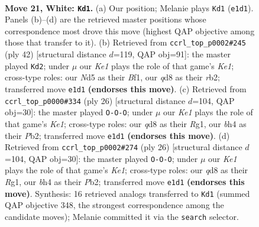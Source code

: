 \documentclass[11pt]{article}
\begin{document}
\clearpage

\begin{figure}[p]\centering
\begin{subfigure}{0.46\textwidth}\centering
\resizebox{\linewidth}{!}{%
\newchessgame
\chessboard[
  setfen={rn1qk1r1/3b1p2/1p1p4/pBpN4/P3P2b/5N1P/RP1Q2P1/4K2R w Kq - 0 21},
  showmover=false,
  pgfstyle=straightmove, color=movearrow, markmove={e1-d1}
]}
\caption{}
\end{subfigure}\hfill
\begin{subfigure}{0.46\textwidth}\centering
\resizebox{\linewidth}{!}{%
\newchessgame
\chessboard[
  setfen={2q1k2r/5ppp/p2p4/3Np3/R2PP1bb/5P2/1rN3PP/3QKB1R w k - 3 22},
  showmover=false,
  pgfstyle=straightmove, color=movearrow, markmove={e1-d2}
]}
\caption{}
\end{subfigure}
\\[4pt]
\begin{subfigure}{0.46\textwidth}\centering
\resizebox{\linewidth}{!}{%
\newchessgame
\chessboard[
  setfen={1rbqk2r/p3bpp1/2pp4/4p1Bn/2B1P2P/2N5/PPPQ1P2/R3K1R1 w Qk - 2 14},
  showmover=false,
  pgfstyle=straightmove, color=movearrow, markmove={e1-c1}
]}
\caption{}
\end{subfigure}\hfill
\begin{subfigure}{0.46\textwidth}\centering
\resizebox{\linewidth}{!}{%
\newchessgame
\chessboard[
  setfen={1rbqk2r/p3bpp1/2pp4/4p1Bn/2B1P2P/2N5/PPPQ1P2/R3K1R1 w Qk - 2 14},
  showmover=false,
  pgfstyle=straightmove, color=movearrow, markmove={e1-c1}
]}
\caption{}
\end{subfigure}
\caption{\textbf{Move 21, White: \texttt{Kd1}.} (a) Our position; Melanie plays \texttt{Kd1} (\texttt{e1d1}). Panels (b)--(d) are the retrieved master positions whose correspondence most drove this move (highest QAP objective among those that transfer to it). (b) Retrieved from \texttt{ccrl\_top\_p0002\#245} (ply 42) [structural distance $d$=119, QAP obj=91]: the master played \texttt{Kd2}; under $\mu$ our \emph{Ke1} plays the role of that game's \emph{Ke1}; cross-type roles: our \emph{N}d5 as their \emph{B}f1, our \emph{q}d8 as their \emph{r}b2; transferred move \texttt{e1d1} \textbf{(endorses this move)}. (c) Retrieved from \texttt{ccrl\_top\_p0000\#334} (ply 26) [structural distance $d$=104, QAP obj=30]: the master played \texttt{O-O-O}; under $\mu$ our \emph{Ke1} plays the role of that game's \emph{Ke1}; cross-type roles: our \emph{q}d8 as their \emph{R}g1, our \emph{b}h4 as their \emph{P}b2; transferred move \texttt{e1d1} \textbf{(endorses this move)}. (d) Retrieved from \texttt{ccrl\_top\_p0002\#274} (ply 26) [structural distance $d$=104, QAP obj=30]: the master played \texttt{O-O-O}; under $\mu$ our \emph{Ke1} plays the role of that game's \emph{Ke1}; cross-type roles: our \emph{q}d8 as their \emph{R}g1, our \emph{b}h4 as their \emph{P}b2; transferred move \texttt{e1d1} \textbf{(endorses this move)}. Synthesis: 16 retrieved analogs transferred to \texttt{Kd1} (summed QAP objective 348, the strongest correspondence among the candidate moves); Melanie committed it via the \texttt{search} selector.}
\label{fig:thought-m40}
\end{figure}
\end{document}
